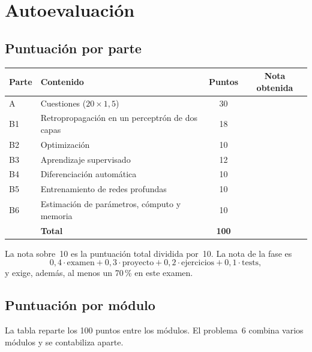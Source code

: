 \chapter{Autoevaluación}
\label{ap:autoevaluacion}

\section{Puntuación por parte}

\begin{center}
\begin{tabular}{@{}llcc@{}}
\toprule
Parte & Contenido & Puntos & Nota obtenida \\
\midrule
A & Cuestiones ($20\times 1{,}5$) & 30 & \\
B1 & Retropropagación en un perceptrón de dos capas & 18 & \\
B2 & Optimización & 10 & \\
B3 & Aprendizaje supervisado & 12 & \\
B4 & Diferenciación automática & 10 & \\
B5 & Entrenamiento de redes profundas & 10 & \\
B6 & Estimación de parámetros, cómputo y memoria & 10 & \\
\midrule
 & \textbf{Total} & \textbf{100} & \\
\bottomrule
\end{tabular}
\end{center}

La nota sobre~10 es la puntuación total dividida por~10. La nota de la fase es
\[
0{,}4\cdot\text{examen}+0{,}3\cdot\text{proyecto}+0{,}2\cdot\text{ejercicios}+0{,}1\cdot\text{tests},
\]
y exige, además, al menos un 70\,\% en este examen.

\section{Puntuación por módulo}

La tabla reparte los 100 puntos entre los módulos. El problema~6 combina varios módulos y se contabiliza aparte.

